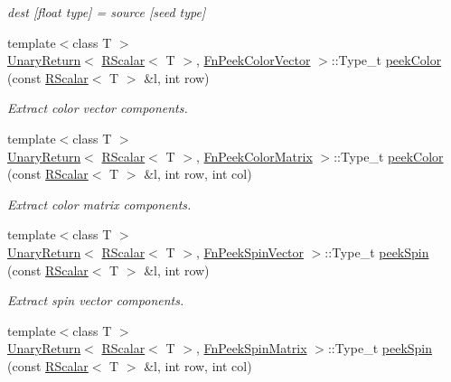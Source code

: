 \begin{DoxyCompactItemize}
\begin{DoxyCompactList}\small\item\em dest \mbox{[}float type\mbox{]} = source \mbox{[}seed type\mbox{]} \end{DoxyCompactList}\item 
{\footnotesize template$<$class T $>$ }\\\mbox{\hyperlink{structENSEM_1_1UnaryReturn}{Unary\+Return}}$<$ \mbox{\hyperlink{classENSEM_1_1RScalar}{R\+Scalar}}$<$ T $>$, \mbox{\hyperlink{structENSEM_1_1FnPeekColorVector}{Fn\+Peek\+Color\+Vector}} $>$\+::Type\+\_\+t \mbox{\hyperlink{group__rscalar_ga9ab62185b545eeb3c9cad28b0c200430}{peek\+Color}} (const \mbox{\hyperlink{classENSEM_1_1RScalar}{R\+Scalar}}$<$ T $>$ \&l, int row)
\begin{DoxyCompactList}\small\item\em Extract color vector components. \end{DoxyCompactList}\item 
{\footnotesize template$<$class T $>$ }\\\mbox{\hyperlink{structENSEM_1_1UnaryReturn}{Unary\+Return}}$<$ \mbox{\hyperlink{classENSEM_1_1RScalar}{R\+Scalar}}$<$ T $>$, \mbox{\hyperlink{structENSEM_1_1FnPeekColorMatrix}{Fn\+Peek\+Color\+Matrix}} $>$\+::Type\+\_\+t \mbox{\hyperlink{group__rscalar_ga692303fb1e668f95b9363df896b04842}{peek\+Color}} (const \mbox{\hyperlink{classENSEM_1_1RScalar}{R\+Scalar}}$<$ T $>$ \&l, int row, int col)
\begin{DoxyCompactList}\small\item\em Extract color matrix components. \end{DoxyCompactList}\item 
{\footnotesize template$<$class T $>$ }\\\mbox{\hyperlink{structENSEM_1_1UnaryReturn}{Unary\+Return}}$<$ \mbox{\hyperlink{classENSEM_1_1RScalar}{R\+Scalar}}$<$ T $>$, \mbox{\hyperlink{structENSEM_1_1FnPeekSpinVector}{Fn\+Peek\+Spin\+Vector}} $>$\+::Type\+\_\+t \mbox{\hyperlink{group__rscalar_gae91157ec10379f83a648e992a01ce0c6}{peek\+Spin}} (const \mbox{\hyperlink{classENSEM_1_1RScalar}{R\+Scalar}}$<$ T $>$ \&l, int row)
\begin{DoxyCompactList}\small\item\em Extract spin vector components. \end{DoxyCompactList}\item 
{\footnotesize template$<$class T $>$ }\\\mbox{\hyperlink{structENSEM_1_1UnaryReturn}{Unary\+Return}}$<$ \mbox{\hyperlink{classENSEM_1_1RScalar}{R\+Scalar}}$<$ T $>$, \mbox{\hyperlink{structENSEM_1_1FnPeekSpinMatrix}{Fn\+Peek\+Spin\+Matrix}} $>$\+::Type\+\_\+t \mbox{\hyperlink{group__rscalar_gafc1d2e7916b4f394f3c5aa75ce62b421}{peek\+Spin}} (const \mbox{\hyperlink{classENSEM_1_1RScalar}{R\+Scalar}}$<$ T $>$ \&l, int row, int col)

\end{DoxyCompactItemize}
